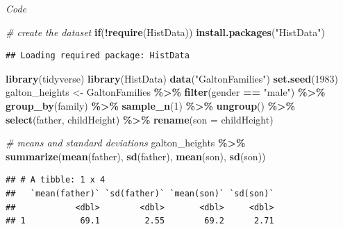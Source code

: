 \documentclass[
]{article}
\newenvironment{Shaded}{\begin{snugshade}}{\end{snugshade}}
\newcommand{\CommentTok}[1]{\textcolor[rgb]{0.56,0.35,0.01}{\textit{#1}}}
\newcommand{\ControlFlowTok}[1]{\textcolor[rgb]{0.13,0.29,0.53}{\textbf{#1}}}
\newcommand{\DataTypeTok}[1]{\textcolor[rgb]{0.13,0.29,0.53}{#1}}
\newcommand{\DecValTok}[1]{\textcolor[rgb]{0.00,0.00,0.81}{#1}}
\newcommand{\KeywordTok}[1]{\textcolor[rgb]{0.13,0.29,0.53}{\textbf{#1}}}
\newcommand{\NormalTok}[1]{#1}
\newcommand{\OperatorTok}[1]{\textcolor[rgb]{0.81,0.36,0.00}{\textbf{#1}}}
\newcommand{\StringTok}[1]{\textcolor[rgb]{0.31,0.60,0.02}{#1}}
\begin{document}
\emph{Code}

\begin{Shaded}
\begin{Highlighting}[]
\CommentTok{\# create the dataset}
\ControlFlowTok{if}\NormalTok{(}\OperatorTok{!}\KeywordTok{require}\NormalTok{(HistData)) }\KeywordTok{install.packages}\NormalTok{(}\StringTok{"HistData"}\NormalTok{)}
\end{Highlighting}
\end{Shaded}

\begin{verbatim}
## Loading required package: HistData
\end{verbatim}

\begin{Shaded}
\begin{Highlighting}[]
\KeywordTok{library}\NormalTok{(tidyverse)}
\KeywordTok{library}\NormalTok{(HistData)}
\KeywordTok{data}\NormalTok{(}\StringTok{"GaltonFamilies"}\NormalTok{)}
\KeywordTok{set.seed}\NormalTok{(}\DecValTok{1983}\NormalTok{)}
\NormalTok{galton\_heights \textless{}{-}}\StringTok{ }\NormalTok{GaltonFamilies }\OperatorTok{\%\textgreater{}\%}
\StringTok{  }\KeywordTok{filter}\NormalTok{(gender }\OperatorTok{==}\StringTok{ "male"}\NormalTok{) }\OperatorTok{\%\textgreater{}\%}
\StringTok{  }\KeywordTok{group\_by}\NormalTok{(family) }\OperatorTok{\%\textgreater{}\%}
\StringTok{  }\KeywordTok{sample\_n}\NormalTok{(}\DecValTok{1}\NormalTok{) }\OperatorTok{\%\textgreater{}\%}
\StringTok{  }\KeywordTok{ungroup}\NormalTok{() }\OperatorTok{\%\textgreater{}\%}
\StringTok{  }\KeywordTok{select}\NormalTok{(father, childHeight) }\OperatorTok{\%\textgreater{}\%}
\StringTok{  }\KeywordTok{rename}\NormalTok{(}\DataTypeTok{son =}\NormalTok{ childHeight)}

\CommentTok{\# means and standard deviations}
\NormalTok{galton\_heights }\OperatorTok{\%\textgreater{}\%}
\StringTok{    }\KeywordTok{summarize}\NormalTok{(}\KeywordTok{mean}\NormalTok{(father), }\KeywordTok{sd}\NormalTok{(father), }\KeywordTok{mean}\NormalTok{(son), }\KeywordTok{sd}\NormalTok{(son))}
\end{Highlighting}
\end{Shaded}

\begin{verbatim}
## # A tibble: 1 x 4
##   `mean(father)` `sd(father)` `mean(son)` `sd(son)`
##            <dbl>        <dbl>       <dbl>     <dbl>
## 1           69.1         2.55        69.2      2.71
\end{verbatim}
\end{document}
